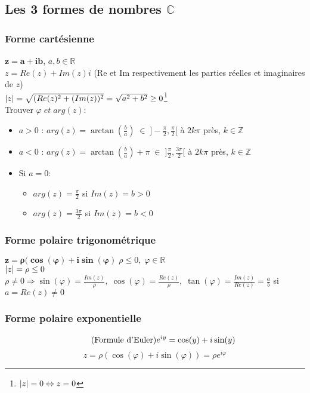 \documentclass[10pt,a4paper]{book}
\newcommand{\R}{\mathbb{R}}
\newcommand{\Z}{\mathbb{Z}}
\newcommand{\C}{\mathbb{C}}
\DeclarePairedDelimiter\abs{\lvert}{\rvert}
\begin{document}
\subsection{Les 3 formes de nombres \texorpdfstring{$\C$}{complexes}}

\subsubsection{Forme cartésienne}

$\mathbf{z=a+ib}$, $a,b\in \R$ \\
$z = Re(z) + Im(z)i$ (Re et Im respectivement les parties réelles et imaginaires de $z$) \\
$\abs{z}= \sqrt{(Re(z)^2 + (Im(z))^2} = \sqrt{a^2 + b^2} \geq 0$\footnote{$\abs{z} = 0 \Leftrightarrow z = 0$} \\
Trouver $\varphi \; et\; arg(z)$:
\begin{itemize}
\item  $a>0$ : $arg(z) = \arctan(\frac{b}{a})\; \in \; ]-\frac{\pi}{2}, \frac{\pi}{2}[$ à $2k\pi$ près, $k\in \Z$
\item  $a<0$ : $arg(z) = \arctan(\frac{b}{a})+\pi \; \in \; ]\frac{\pi}{2}, \frac{3\pi}{2}[$ à $2k\pi$ près, $k\in \Z$
\item Si $a=0$:
\begin{itemize}
\item $arg(z) = \frac{\pi}{2}$ si $Im(z)=b > 0$
\item $arg(z) = \frac{3\pi}{2}$ si $Im(z)=b < 0$
\end{itemize}
\end{itemize}

\subsubsection{Forme polaire trigonométrique}

$\mathbf{z = \rho (\cos(\varphi) + i\sin(\varphi)} \; \rho \leq 0, \; \varphi \in \R$ \\
$\abs{z} = \rho \leq 0$
$\rho \neq 0 \Rightarrow \sin(\varphi) = \frac{Im(z)}{\rho}, \; \cos(\varphi) = \frac{Re(z)}{\rho}, \; \tan(\varphi) = \frac{Im(z)}{Re(z)} = \frac{a}{b}$ si $a = Re(z)\neq 0$

\subsubsection{Forme polaire exponentielle}

\begin{equation} \tag{Formule d'Euler}
e^{iy} = \cos(y) + i\sin(y) \\
\end{equation}
\begin{equation*}
z = \rho(\cos(\varphi) + i\sin(\varphi)) = \rho e^{i\varphi}
\end{equation*}
\end{document}
